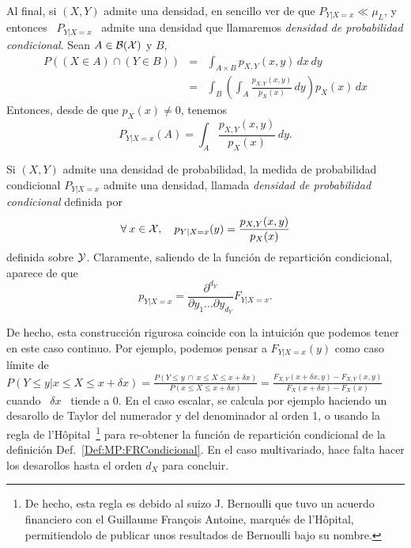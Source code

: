 Al final, si $(X,Y)$ admite una  densidad, en sencillo ver de que $P_{Y|X=x} \ll
\mu_L$,  y entonces  \ $P_{Y|X=x}$  \ admite  una densidad  que  llamaremos {\it
  densidad de probabilidad condicional}. Sean $A \in \mathcal{B}(\mathcal{X})$ y $B$,
%
\begin{eqnarray*}
P\left( (X \in A) \cap (Y \in B) \right) & = & \int_{A \times B} p_{X,Y}(x,y) \, dx \, dy\\[2mm]
%
& = & \int_B \left( \int_A \frac{p_{X,Y}(x,y)}{p_X(x)} \, dy \right) p_X(x) \, dx
\end{eqnarray*}
%
Entonces, desde de que $p_X(x) \ne 0$, tenemos
%
\[
P_{Y|X=x}(A) = \int_A \frac{p_{X,Y}(x,y)}{p_X(x)} \, dy.
\]
%
\begin{teorema}
  Si  $(X,Y)$ admite  una densidad  de probabilidad,  la medida  de probabilidad
  condicional  $P_{Y|X=x}$  admite  una   densidad,  llamada  {\it  densidad  de
    probabilidad condicional} definida por
  \[
  \forall \: x \in \mathcal{X}, \quad p_{Y|X=x}(y) = \frac{p_{X,Y}(x,y)}{p_X(x)}
  \]
  definida  sobre $\mathcal{Y}$. Claramente,  saliendo de  la funci\'on  de repartici\'on
  condicional, aparece de que
  \[
  p_{Y|X=x} = \frac{\partial^{d_Y}}{\partial y_1 \ldots \partial y_{d_Y}} F_{Y|X=x}.
  \]
\end{teorema}

De hecho, esta  construcci\'on rigurosa coincide con la  intuici\'on que podemos
tener en este  caso continuo. Por ejemplo, podemos  pensar a $F_{Y|X=x}(y)$ como
caso l\'imite de $P(\left. Y \le y \right|  x \le X \le x+\delta x) = \frac{P( Y
  \le  y \:  \cap \:  x \le  X \le  x+\delta x)}{P(x  \le X  \le x+\delta  x)} =
\frac{F_{X,Y}(x+\delta  x ,  y) -  F_{X,Y}(x  , y)}{F_X(x+\delta  x) -  F_X(x)}$
cuando \ $\delta  x$ \ tiende a 0.   En el caso escalar, se  calcula por ejemplo
haciendo un  desarollo de Taylor del numerador  y del denominador al  orden 1, o
usando la regla de l'H\^opital~\footnote{De hecho, esta regla es debido al suizo
  J.  Bernoulli  que tuvo  un acuerdo financiero  con el  Guillaume Fran\c{c}ois
  Antoine, marqu\'es  de l'H\^opital, permitiendolo de  publicar unos resultados
  de Bernoulli bajo  su nombre.}  para re-obtener la  funci\'on de repartici\'on
condicional  de  la  definici\'on  Def.~\ref{Def:MP:FRCondicional}. En  el  caso
multivariado,  hace  falta  hacer  los  desarollos hasta  el  orden  $d_X$  para
concluir.

